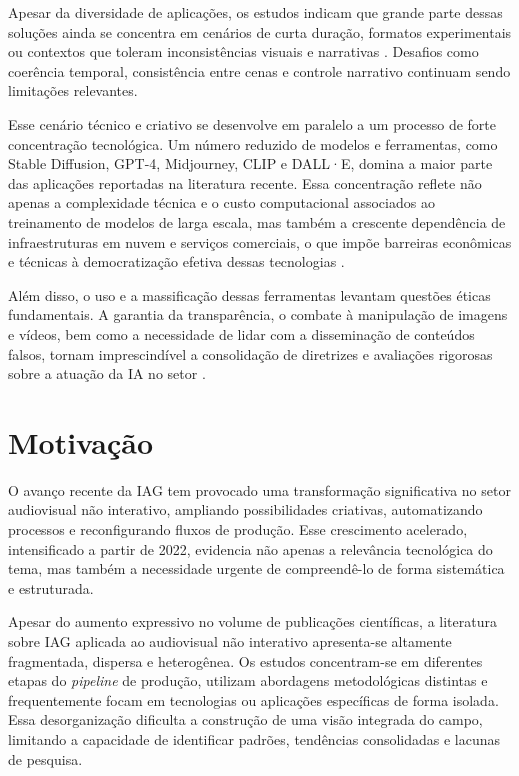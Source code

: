 Apesar da diversidade de aplicações, os estudos indicam que grande parte dessas soluções ainda se concentra em cenários de curta duração, formatos experimentais ou contextos que toleram inconsistências visuais e narrativas \citep{RothAleo2026}. Desafios como coerência temporal, consistência entre cenas e controle narrativo continuam sendo limitações relevantes.

Esse cenário técnico e criativo se desenvolve em paralelo a um processo de forte concentração tecnológica. Um número reduzido de modelos e ferramentas, como Stable Diffusion, GPT-4, Midjourney, CLIP e DALL·E, domina a maior parte das aplicações reportadas na literatura recente. Essa concentração reflete não apenas a complexidade técnica e o custo computacional associados ao treinamento de modelos de larga escala, mas também a crescente dependência de infraestruturas em nuvem e serviços comerciais, o que impõe barreiras econômicas e técnicas à democratização efetiva dessas tecnologias \citep{brown2020language}. 

Além disso, o uso e a massificação dessas ferramentas levantam questões éticas fundamentais. A garantia da transparência, o combate à manipulação de imagens e vídeos, bem como a necessidade de lidar com a disseminação de conteúdos falsos, tornam imprescindível a consolidação de diretrizes e avaliações rigorosas sobre a atuação da IA no setor \citep{capraro2024impact}.

\section{Motivação}

O avanço recente da IAG tem provocado uma transformação significativa no setor audiovisual não interativo, ampliando possibilidades criativas, automatizando processos e reconfigurando fluxos de produção. Esse crescimento acelerado, intensificado a partir de 2022, evidencia não apenas a relevância tecnológica do tema, mas também a necessidade urgente de compreendê-lo de forma sistemática e estruturada.

Apesar do aumento expressivo no volume de publicações científicas, a literatura sobre IAG aplicada ao audiovisual não interativo apresenta-se altamente fragmentada, dispersa e heterogênea. Os estudos concentram-se em diferentes etapas do \textit{pipeline} de produção, utilizam abordagens metodológicas distintas e frequentemente focam em tecnologias ou aplicações específicas de forma isolada. Essa desorganização dificulta a construção de uma visão integrada do campo, limitando a capacidade de identificar padrões, tendências consolidadas e lacunas de pesquisa.

